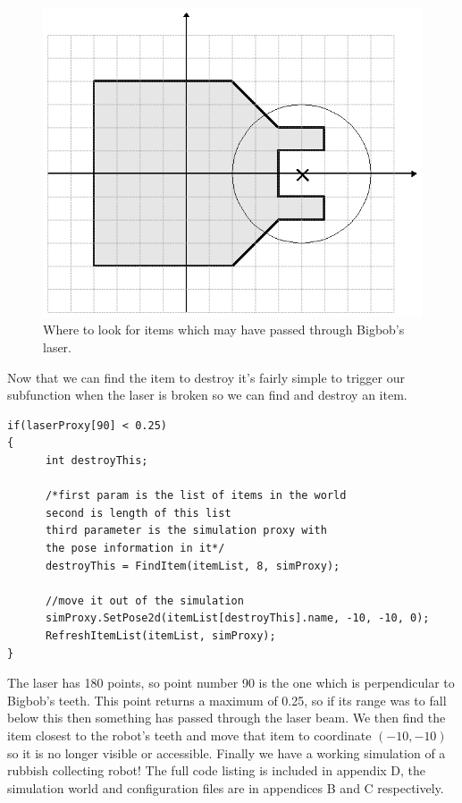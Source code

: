 \documentclass[a4paper]{report}
\begin{document}
\begin{figure}
	\centering
	\includegraphics[width=0.7\linewidth]{./pics/coding/bigbob_radius.png}
	\caption{Where to look for items which may have passed through Bigbob's laser.}
	\label{fig:bigboblaserradius}
\end{figure} 

Now that we can find the item to destroy it's fairly simple to trigger our subfunction when the laser is broken so we can find and destroy an item.
\begin{verbatim}
if(laserProxy[90] < 0.25)
{
      int destroyThis;

      /*first param is the list of items in the world
      second is length of this list
      third parameter is the simulation proxy with 
      the pose information in it*/
      destroyThis = FindItem(itemList, 8, simProxy);
 
      //move it out of the simulation
      simProxy.SetPose2d(itemList[destroyThis].name, -10, -10, 0);
      RefreshItemList(itemList, simProxy);
}
\end{verbatim}
The laser has 180 points, so point number 90 is the one which is perpendicular to Bigbob's teeth. This point returns a maximum of 0.25, so if its range was to fall below this then something has passed through the laser beam. We then find the item closest to the robot's teeth and move that item to coordinate $(-10, -10)$ so it is no longer visible or accessible.
\newline
Finally we have a working simulation of a rubbish collecting robot! The full code listing is included in appendix D, the simulation world and configuration files are in appendices B and C respectively.
\end{document}
